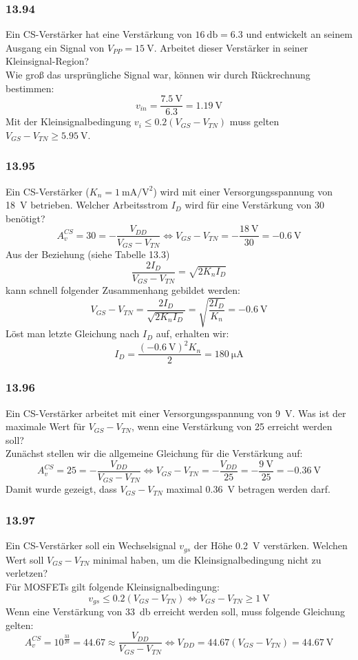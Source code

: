 \documentclass[11pt,a4paper,titlepage]{article}
\begin{document}
\subsubsection*{13.94}
Ein CS-Verstärker hat eine Verstärkung von $\SI{16}{\decibel} = 6.3$ und entwickelt an seinem Ausgang ein Signal von $V_{PP} = \SI{15}{\volt}$. Arbeitet dieser Verstärker in seiner Kleinsignal-Region?\\
Wie groß das ursprüngliche Signal war, können wir durch Rückrechnung bestimmen:
\[ v_{in} = \frac{\SI{7.5}{\volt}}{6.3} = \SI{1.19}{\volt} \]
Mit der Kleinsignalbedingung $v_i \leq 0.2(V_{GS}-V_{TN})$ muss gelten $V_{GS}-V_{TN} \geq \SI{5.95}{\volt}$.

\subsubsection*{13.95}
Ein CS-Verstärker ($K_n = \SI{1}{\milli\ampere\per\square\volt}$) wird mit einer Versorgungsspannung von \SI{18}{\volt} betrieben. Welcher Arbeitsstrom $I_D$ wird für eine Verstärkung von 30 benötigt?
\[ A_v^{CS} = 30 = - \frac{V_{DD}}{V_{GS}-V_{TN}} \Leftrightarrow V_{GS}-V_{TN} = - \frac{\SI{18}{\volt}}{30} = - \SI{0.6}{\volt} \]
Aus der Beziehung (siehe Tabelle 13.3)
\[ \frac{2I_D}{V_{GS}-V_{TN}} = \sqrt{2K_nI_D} \]
kann schnell folgender Zusammenhang gebildet werden:
\[ V_{GS}-V_{TN} = \frac{2I_D}{\sqrt{2K_nI_D}} = \sqrt{\frac{2I_D}{K_n}} = -\SI{0.6}{\volt} \]
Löst man letzte Gleichung nach $I_D$ auf, erhalten wir:
\[ I_D = \frac{(\SI{-0.6}{\volt})^2K_n}{2} = \SI{180}{\micro\ampere} \]

\subsubsection*{13.96}
Ein CS-Verstärker arbeitet mit einer Versorgungsspannung von \SI{9}{\volt}. Was ist der maximale Wert für $V_{GS}-V_{TN}$, wenn eine Verstärkung von 25 erreicht werden soll?\\
Zunächst stellen wir die allgemeine Gleichung für die Verstärkung auf:
\[  A_v^{CS} = 25 = - \frac{V_{DD}}{V_{GS}-V_{TN}} \Leftrightarrow V_{GS}-V_{TN} = - \frac{V_{DD}}{25} = - \frac{\SI{9}{\volt}}{25} = - \SI{0.36}{\volt}\]
Damit wurde gezeigt, dass $V_{GS}-V_{TN}$ maximal \SI{0.36}{\volt} betragen werden darf.

\subsubsection*{13.97}
Ein CS-Verstärker soll ein Wechselsignal $v_{gs}$ der Höhe \SI{0.2}{\volt} verstärken. Welchen Wert soll $V_{GS}-V_{TN}$ minimal haben, um die Kleinsignalbedingung nicht zu verletzen?\\
Für MOSFETs gilt folgende Kleinsignalbedingung:
\[ v_{gs} \leq 0.2(V_{GS}-V_{TN}) \Leftrightarrow V_{GS}-V_{TN} \geq \SI{1}{\volt} \]
Wenn eine Verstärkung von \SI{33}{\decibel} erreicht werden soll, muss folgende Gleichung gelten:
\[ A_{v}^{CS} = 10^{\frac{33}{20}} = 44.67 \approx \frac{V_{DD}}{V_{GS}-V_{TN}} \Leftrightarrow V_{DD} = 44.67(V_{GS}-V_{TN}) = \SI{44.67}{\volt} \]
\end{document}

